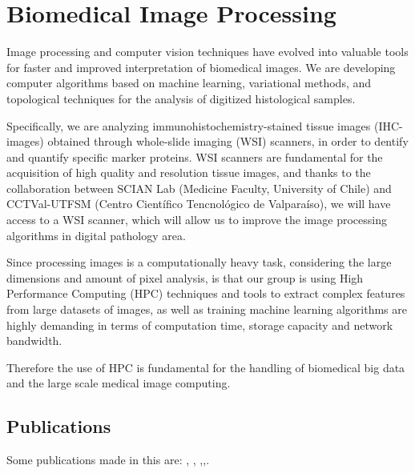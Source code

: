 \section{Biomedical Image Processing}

Image processing and computer vision techniques have evolved into valuable
tools for faster and improved interpretation of biomedical images.
We are developing computer algorithms based on machine learning, variational
methods, and topological techniques for the analysis of digitized histological
samples.

Specifically, we are analyzing immunohistochemistry-stained tissue images
(IHC-images) obtained through whole-slide imaging (WSI) scanners, in order to
dentify and quantify specific marker proteins.
WSI scanners are fundamental for the acquisition of high quality and resolution
tissue images, and thanks to the collaboration between SCIAN Lab (Medicine Faculty,
University of Chile) and CCTVal-UTFSM (Centro Científico Tencnológico de
Valparaíso), we will have access to a WSI scanner,  which will allow us to improve
the image processing algorithms in digital pathology area.

Since processing images is a computationally heavy task,
considering the large dimensions and amount of pixel analysis,
is that our group is using High Performance Computing (HPC) techniques
and tools to extract complex features from large datasets of images,
as well as training machine learning algorithms are highly demanding in terms
of computation time, storage capacity and network bandwidth.

Therefore the use of HPC is fundamental for the handling of biomedical big data
and the large scale medical image computing.

\subsection{Publications}

Some publications made in this are: \cite{pezoa2014}, \cite{pezoa2012},
\cite{pezoaGold},\cite{pezoa2011b},\cite{pezoa2011a}.


